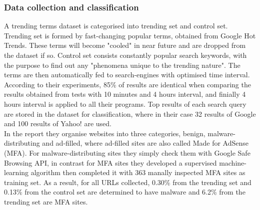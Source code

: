 \subsubsection*{Data collection and classification}
A trending terms dataset is categorised into trending set and control set. 
Trending set is formed by fast-changing popular terms, obtained from Google 
Hot Trends. These terms will become "cooled" in near future and are dropped 
from the dataset if so. Control set consists constantly popular search 
keywords, with the purpose to find out any "phenomena unique to the trending 
nature". The terms are then automatically fed to search-engines with optimised 
time interval. According to their experiments, 85\% of results are identical 
when comparing the results obtained from tests with 10 minutes and 4 hours 
interval, and finially 4 hours interval is applied to all their programs. Top 
results of each search query are stored in the dataset for classification, 
where in their case 32 results of Google and 100 results of Yahoo! are used. \\
In the report they organise websites into three categories, benign, 
malware-distributing and ad-filled, where ad-filled sites are also called Made 
for AdSense (MFA). For malware-distributing sites they simply check them with 
Google Safe Browsing API, in contrast for MFA sites they developed a 
supervised machine-learning algorithm then completed it with 363 manally 
inspected MFA sites as training set. As a result, for all URLs collected, 
0.30\% from the trending set and 0.13\% from the control set are determined to 
have malware and 6.2\% from the trending set are MFA sites. 
